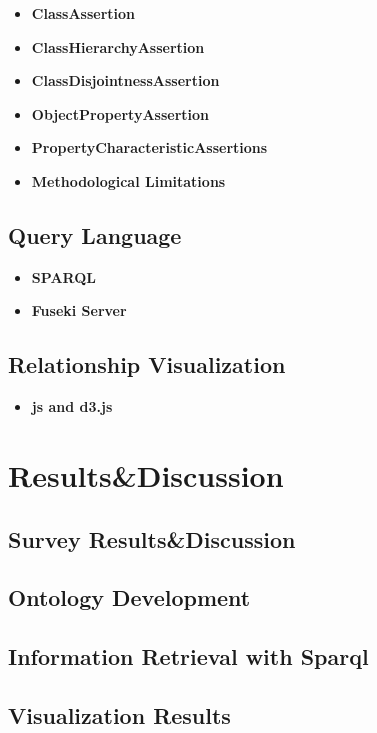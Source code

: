 \documentclass[runningheads]{llncs}
\begin{document}
\begin{itemize}
    \item \textbf{ClassAssertion}
    \item \textbf{ClassHierarchyAssertion}
    \item \textbf{ClassDisjointnessAssertion}
    \item \textbf{ObjectPropertyAssertion}
    \item \textbf{PropertyCharacteristicAssertions}
    \item \textbf{Methodological Limitations}
\end{itemize}

\subsection{Query Language}
\begin{itemize}
    \item \textbf{SPARQL}
    \item \textbf{Fuseki Server}
\end{itemize}
\subsection{Relationship Visualization}
\begin{itemize}
    \item \textbf{js and d3.js}
\end{itemize}

\section{Results\&Discussion}

\subsection{Survey Results\&Discussion}

\subsection{Ontology Development}
\subsection{Information Retrieval with Sparql}
\subsection{Visualization Results}
\end{document}
